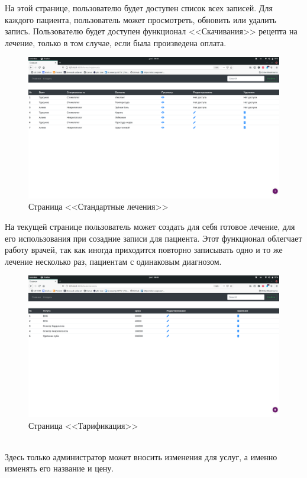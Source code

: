 \documentclass[a4paper, 10pt]{article}
\begin{document}
 	\hspace*{5mm} На этой странице, пользователю будет доступен список всех записей. Для каждого пациента, пользователь может просмотреть, обновить или удалить запись. Пользователю будет доступен функционал <<Скачивания>> рецепта на лечение, только в том случае, если была произведена оплата.
 	\begin{figure}[h!]
 		\centering
 		\includegraphics[scale=0.12]{discharges}
 		\centering\caption{Страница <<Стандартные лечения>>}
 	\end{figure}
 	\clearpage
 	\newpage
 	\hspace*{5mm} На текущей странице пользователь может создать для себя готовое лечение, для его использования при созадние записи для пациента. Этот функционал облегчает работу врачей, так как иногда приходится повторно записывать одно и то же лечение несколько раз, пациентам с одинаковым диагнозом. 
 	\begin{figure}[h!]
 		\centering
 		\includegraphics[scale=0.12]{services}
 		\centering\caption{Страница <<Тарификация>>}
 	\end{figure}
 	\\ \hspace*{5mm} Здесь только администратор может вносить изменения для услуг, а именно изменять его название и цену. 
\end{document}
